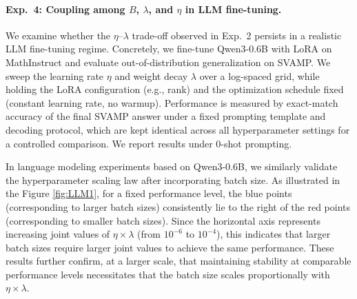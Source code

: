 
\paragraph{Exp.\ 4: Coupling among $B$, $\lambda$, and $\eta$ in LLM fine-tuning.}
We examine whether the $\eta$–$\lambda$ trade-off observed in Exp.~2 persists in a realistic LLM fine-tuning regime. Concretely, we fine-tune Qwen3-0.6B with LoRA on MathInstruct and evaluate out-of-distribution generalization on SVAMP. We sweep the learning rate $\eta$ and weight decay $\lambda$ over a log-spaced grid, while holding the LoRA configuration (e.g., rank) and the optimization schedule fixed (constant learning rate, no warmup). Performance is measured by exact-match accuracy of the final SVAMP answer under a fixed prompting template and decoding protocol, which are kept identical across all hyperparameter settings for a controlled comparison. We report results under 0-shot prompting.


In language modeling experiments based on Qwen3-0.6B, we similarly validate the hyperparameter scaling law after incorporating batch size. As illustrated in the Figure \ref{fig:LLM1}, for a fixed performance level, the blue points (corresponding to larger batch sizes) consistently lie to the right of the red points (corresponding to smaller batch sizes). Since the horizontal axis represents increasing joint values of $\eta\times\lambda$ (from $10^{-6}$ to $10^{-4}$), this indicates that larger batch sizes require larger joint values to achieve the same performance. These results further confirm, at a larger scale, that maintaining stability at comparable performance levels necessitates that the batch size scales proportionally with $\eta\times\lambda$. 


